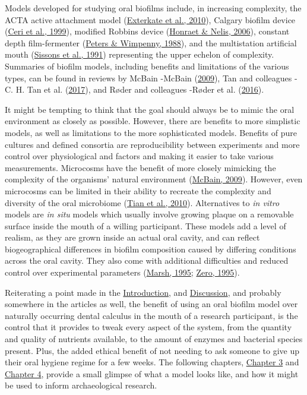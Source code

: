 \documentclass[
  b5paper,
]{book}
\begin{document}
Models developed for studying oral biofilms include, in increasing
complexity, the ACTA active attachment model
(\protect\hyperlink{ref-extercateAAA2010}{Exterkate et al., 2010}),
Calgary biofilm device
(\protect\hyperlink{ref-ceriCalgaryBiofilm1999}{Ceri et al., 1999}),
modified Robbins device
(\protect\hyperlink{ref-honraetModifiedRobbins2006}{Honraet \& Nelis,
2006}), constant depth film-fermenter
(\protect\hyperlink{ref-petersConstantDepth1988}{Peters \& Wimpenny,
1988}), and the multistation artificial mouth
(\protect\hyperlink{ref-sissonsMultistationPlaque1991}{Sissons et al.,
1991}) representing the upper echelon of complexity. Summaries of
biofilm models, including benefits and limitations of the various types,
can be found in reviews by McBain -McBain
(\protect\hyperlink{ref-mcbainBiofilmModels2009}{2009}), Tan and
colleagues -C. H. Tan et al.
(\protect\hyperlink{ref-tanAllTogether2017}{2017}), and Røder and
colleagues -Røder et al.
(\protect\hyperlink{ref-roderStudyingBacterial2016}{2016}).

It might be tempting to think that the goal should always be to mimic
the oral environment as closely as possible. However, there are benefits
to more simplistic models, as well as limitations to the more
sophisticated models. Benefits of pure cultures and defined consortia
are reproducibility between experiments and more control over
physiological and factors and making it easier to take various
measurements. Microcosms have the benefit of more closely mimicking the
complexity of the organisms' natural environment
(\protect\hyperlink{ref-mcbainBiofilmModels2009}{McBain, 2009}).
However, even microcosms can be limited in their ability to recreate the
complexity and diversity of the oral microbiome
(\protect\hyperlink{ref-tianUsingDGGE2010}{Tian et al., 2010}).
Alternatives to \emph{in vitro} models are \emph{in situ} models which
usually involve growing plaque on a removable surface inside the mouth
of a willing participant. These models add a level of realism, as they
are grown inside an actual oral cavity, and can reflect biogeographical
differences in biofilm composition caused by differing conditions across
the oral cavity. They also come with additional difficulties and reduced
control over experimental parameters
(\protect\hyperlink{ref-marshRoleMicrobiology1995}{Marsh, 1995};
\protect\hyperlink{ref-zeroSituCaries1995}{Zero, 1995}).

Reiterating a point made in the
\protect\hyperlink{chap-intro}{Introduction}, and
\protect\hyperlink{chap-discussion}{Discussion}, and probably somewhere
in the articles as well, the benefit of using an oral biofilm model over
naturally occurring dental calculus in the mouth of a research
participant, is the control that it provides to tweak every aspect of
the system, from the quantity and quality of nutrients available, to the
amount of enzymes and bacterial species present. Plus, the added ethical
benefit of not needing to ask someone to give up their oral hygiene
regime for a few weeks. The following chapters,
\protect\hyperlink{byoc-valid}{Chapter 3} and
\protect\hyperlink{byoc-starch}{Chapter 4}, provide a small glimpse of
what a model looks like, and how it might be used to inform
archaeological research.
\end{document}
